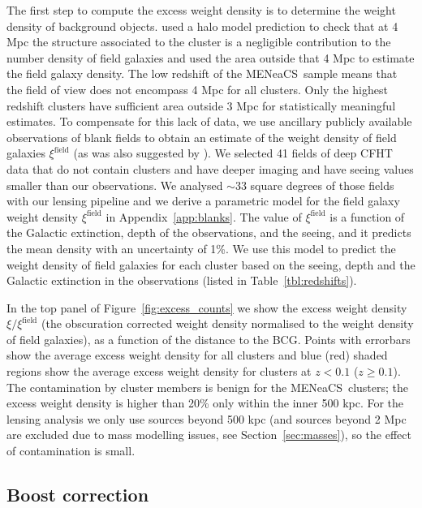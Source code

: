 \documentclass[useAMS,usenatbib]{mnras}
\newcommand{\mn}{MENeaCS}
\begin{document}
The first step to compute the excess weight density is to determine the weight density of background objects.  used a halo model prediction to check that at 4 Mpc the structure associated to the cluster is a negligible contribution to the number density of field galaxies and used the area outside that 4 Mpc to estimate the field galaxy density. The low redshift of the \mn \ sample means that the field of view does not encompass 4 Mpc for all clusters. Only the highest redshift clusters have sufficient area outside 3 Mpc for statistically meaningful estimates. To compensate for this lack of data, we use ancillary publicly available observations of blank fields to obtain an estimate of the weight density of field galaxies $\xi^\mathrm{field}$ (as was also suggested by \citealt{schrabback18}). We selected 41 fields of deep CFHT data that do not contain clusters and have deeper imaging and have seeing values smaller than our observations. We analysed $\sim$33 square degrees of those fields with our lensing pipeline and we derive a parametric model for the field galaxy weight density $\xi^\mathrm{field}$ in Appendix~\ref{app:blanks}. The value of $\xi^\mathrm{field}$ is a function of the Galactic extinction, depth of the observations, and the seeing, and it predicts the mean density with an uncertainty of 1\%.
We use this model to predict the weight density of field galaxies for each cluster based on the seeing, depth and the Galactic extinction in the observations (listed in Table~\ref{tbl:redshifts}).


In the top panel of Figure~\ref{fig:excess_counts} we show the excess weight density $\xi/ \xi^\mathrm{field}$ (the obscuration corrected weight density normalised to the weight density of field galaxies), as a function of the distance to the BCG. Points with errorbars show the average excess weight density for all clusters and blue (red) shaded regions show the average excess weight density for clusters at $z<0.1$ ($z\geq0.1$). The contamination by cluster members is benign for the \mn \ clusters; the excess weight density is higher than 20\% only within the inner 500 kpc. For the lensing analysis we only use sources beyond 500 kpc (and sources beyond 2 Mpc are excluded due to mass modelling issues, see Section~\ref{sec:masses}), so the effect of contamination is small. 


 


\subsection{Boost correction}
\label{sec:boostcorr}
\end{document}
